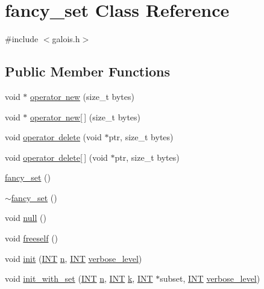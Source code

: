 \hypertarget{classfancy__set}{}\section{fancy\+\_\+set Class Reference}
\label{classfancy__set}


{\ttfamily \#include $<$galois.\+h$>$}

\subsection*{Public Member Functions}
\begin{DoxyCompactItemize}
\item 
void $\ast$ \mbox{\hyperlink{classfancy__set_aa3cd291c07ee0c2bf132bae673915949}{operator new}} (size\+\_\+t bytes)
\item 
void $\ast$ \mbox{\hyperlink{classfancy__set_a0544eccb3c739e24da2e6f5c57720b6b}{operator new\mbox{[}$\,$\mbox{]}}} (size\+\_\+t bytes)
\item 
void \mbox{\hyperlink{classfancy__set_ac7b65db25361c92c61c0da9959f3466f}{operator delete}} (void $\ast$ptr, size\+\_\+t bytes)
\item 
void \mbox{\hyperlink{classfancy__set_a55de66bbfd245c462b2d34625c809ac2}{operator delete\mbox{[}$\,$\mbox{]}}} (void $\ast$ptr, size\+\_\+t bytes)
\item 
\mbox{\hyperlink{classfancy__set_a636dcf13f334a3e0aa9e94b04a155600}{fancy\+\_\+set}} ()
\item 
\mbox{\hyperlink{classfancy__set_a9ed093ccc0c2a48d66d2ee80ade0122a}{$\sim$fancy\+\_\+set}} ()
\item 
void \mbox{\hyperlink{classfancy__set_aff1fda2965c81d7e7429d3857b4b7779}{null}} ()
\item 
void \mbox{\hyperlink{classfancy__set_a3de25ec1378ce4a9e6a8c10413c1d1d3}{freeself}} ()
\item 
void \mbox{\hyperlink{classfancy__set_af3ef2500d80ad02c08887b352bc49fb8}{init}} (\mbox{\hyperlink{galois_8h_a09fddde158a3a20bd2dcadb609de11dc}{I\+NT}} \mbox{\hyperlink{classfancy__set_a25ff45c6332feb9a6a2bff3156b4c814}{n}}, \mbox{\hyperlink{galois_8h_a09fddde158a3a20bd2dcadb609de11dc}{I\+NT}} \mbox{\hyperlink{simeon_8_c_a818073fbcc2f439e7c56952f67386122}{verbose\+\_\+level}})
\item 
void \mbox{\hyperlink{classfancy__set_a03b0a2b524e9ab493499c0f5f9fe4cfd}{init\+\_\+with\+\_\+set}} (\mbox{\hyperlink{galois_8h_a09fddde158a3a20bd2dcadb609de11dc}{I\+NT}} \mbox{\hyperlink{classfancy__set_a25ff45c6332feb9a6a2bff3156b4c814}{n}}, \mbox{\hyperlink{galois_8h_a09fddde158a3a20bd2dcadb609de11dc}{I\+NT}} \mbox{\hyperlink{classfancy__set_a24542fbd3ff9860949ef8a33ca889c40}{k}}, \mbox{\hyperlink{galois_8h_a09fddde158a3a20bd2dcadb609de11dc}{I\+NT}} $\ast$subset, \mbox{\hyperlink{galois_8h_a09fddde158a3a20bd2dcadb609de11dc}{I\+NT}} \mbox{\hyperlink{simeon_8_c_a818073fbcc2f439e7c56952f67386122}{verbose\+\_\+level}})

\end{DoxyCompactItemize}
